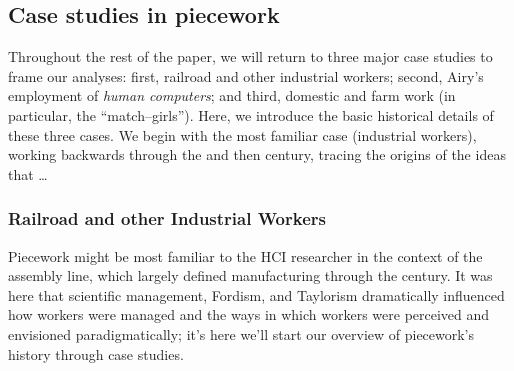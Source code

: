 \documentclass[trackingWork]{subfiles}
\begin{document}
\subsection{Case studies in piecework}
Throughout the rest of the paper, we will return to three major case studies to frame our analyses:
first, railroad and other industrial workers;
second, Airy's employment of \textit{human computers};
and third, domestic and farm work (in particular, the ``match--girls'').
Here, we introduce the basic historical details of these three cases.
We begin with the most familiar case (industrial workers),
working backwards through the  and then  century,
tracing the origins of the ideas that \dots







\subsubsection{Railroad and other Industrial Workers}
{Piecework might be most familiar to the HCI researcher in the context of the assembly line, which largely defined manufacturing through the  century.}
It was here that
scientific management, Fordism, and Taylorism
dramatically influenced how workers were managed and
the ways in which workers were perceived and envisioned paradigmatically;
it's here we'll start our overview of piecework's history through case studies. 
\end{document}
